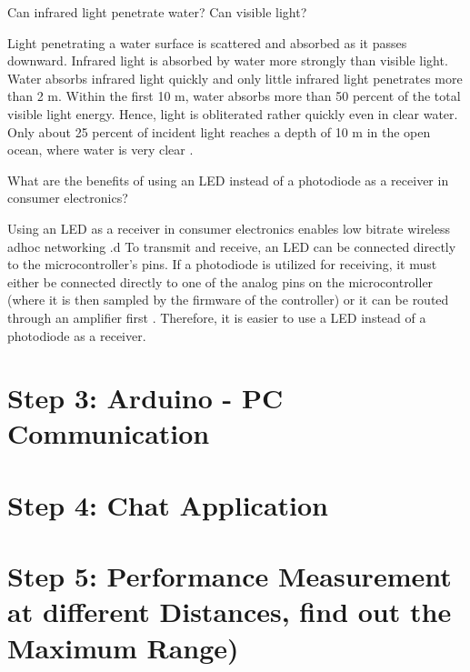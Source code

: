 \documentclass[
	12pt, %
]{fphw}
\begin{document}
\begin{problem}
	Can infrared light penetrate water? Can visible light?
\end{problem}
Light penetrating a water surface is scattered and absorbed as it passes downward. Infrared light is absorbed by water more strongly than visible light. Water absorbs infrared light quickly and only little infrared light penetrates more than 2 m.  
Within the first 10 m, water absorbs more than 50 percent of the total visible light energy. Hence, light is obliterated rather quickly even in clear water. Only about 25 percent of incident light reaches a depth of 10 m in the open ocean, where water is very clear \cite{LightInTheOceanHawaiiEdu}.

\begin{problem}
	What are the benefits of using an LED instead of a photodiode as a receiver in consumer electronics?
\end{problem}
Using an LED as a receiver in consumer electronics enables low bitrate wireless adhoc networking \cite{10.1145/2491288.2491293}.d
To transmit and receive, an LED can be connected directly to the microcontroller's pins. If a photodiode is utilized for receiving, it must either be connected directly to one of the analog pins on the microcontroller (where it is then sampled by the firmware of the controller) or it can be routed through an amplifier first \cite{7732989}. Therefore, it is easier to use  a LED instead of a photodiode as a receiver. 




\section*{Step 3: Arduino - PC Communication}




\section*{Step 4: Chat Application}



\section*{Step 5: Performance Measurement at different Distances, find out the Maximum Range)}




\clearpage
\printbibliography
\end{document}
